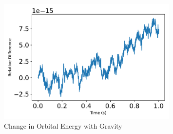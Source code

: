 \begin{figure}[htbp]\centerline{\includegraphics[width=0.8\textwidth]{AutoTeX/ChangeInOrbitalEnergy1}}\caption{Change in Orbital Energy with Gravity}\label{fig:ChangeInOrbitalEnergy1}\end{figure}